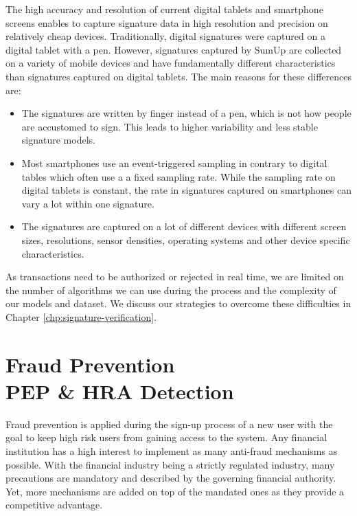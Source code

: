 \documentclass[a4paper, oneside]{csthesis}
\begin{document}
The high accuracy and resolution of current digital tablets and smartphone screens enables to capture signature data in high resolution and precision on relatively cheap devices.
Traditionally, digital signatures were captured on a digital tablet with a pen. However, signatures captured by SumUp are collected on a variety of mobile devices and have fundamentally different characteristics than signatures captured on digital tablets. The main reasons for these differences are:

\begin{itemize}
    \item The signatures are written by finger instead of a pen, which is not how people are accustomed to sign. This leads to higher variability and less stable signature models.
    \item Most smartphones use an event-triggered sampling in contrary to digital tables which often use a a fixed sampling rate. While the sampling rate on digital tablets is constant, the rate in signatures captured on smartphones can vary a lot within one signature.
    \item The signatures are captured on a lot of different devices with different screen sizes, resolutions, sensor densities, operating systems and other device specific characteristics.
\end{itemize}

As transactions need to be authorized or rejected in real time, we are limited on the number of algorithms we can use during the process and the complexity of our models and dataset.
We discuss our strategies to overcome these difficulties in Chapter \ref{chp:signature-verification}.




\chapter{Fraud Prevention \\PEP \& HRA Detection}

Fraud prevention is applied during the sign-up process of a new user with the goal to keep high risk users from gaining access to the system.
Any financial institution has a high interest to implement as many anti-fraud mechanisms as possible. With the financial industry being a strictly regulated industry, many precautions are mandatory and described by the governing financial authority. Yet, more mechanisms are added on top of the mandated ones as they provide a competitive advantage.
\end{document}
